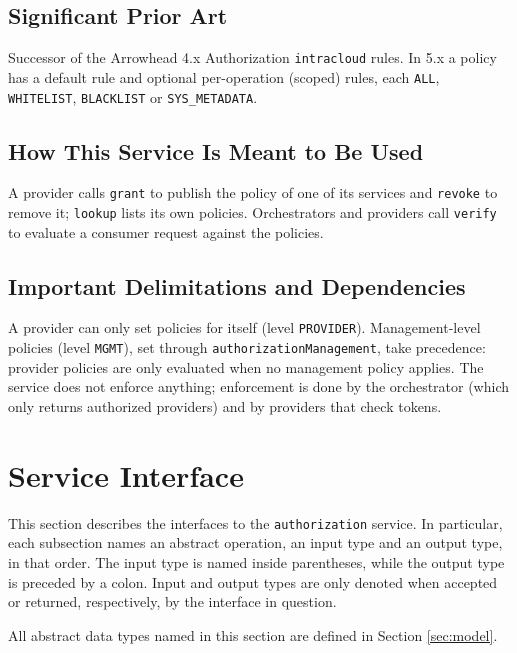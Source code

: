 \documentclass[a4paper]{arrowhead}
\begin{document}
\subsection{Significant Prior Art}

Successor of the Arrowhead 4.x Authorization \texttt{intracloud} rules. In 5.x a policy has a default rule and optional per-operation (scoped) rules, each \texttt{ALL}, \texttt{WHITELIST}, \texttt{BLACKLIST} or \texttt{SYS\_\allowbreak{}METADATA}.

\subsection{How This Service Is Meant to Be Used}

A provider calls \texttt{grant} to publish the policy of one of its services and \texttt{revoke} to remove it; \texttt{lookup} lists its own policies. Orchestrators and providers call \texttt{verify} to evaluate a consumer request against the policies.

\subsection{Important Delimitations and Dependencies}
\label{sec:delimitations}

A provider can only set policies for itself (level \texttt{PROVIDER}). Management-level policies (level \texttt{MGMT}), set through \texttt{authorization\allowbreak{}Management}, take precedence: provider policies are only evaluated when no management policy applies. The service does not enforce anything; enforcement is done by the orchestrator (which only returns authorized providers) and by providers that check tokens.

\newpage

\section{Service Interface}
\label{sec:operations}

This section describes the interfaces to the \texttt{authorization} service.
In particular, each subsection names an abstract operation, an input type and an output type, in that order.
The input type is named inside parentheses, while the output type is preceded by a colon.
Input and output types are only denoted when accepted or returned, respectively, by the interface in question.

All abstract data types named in this section are defined in Section \ref{sec:model}.
\end{document}
